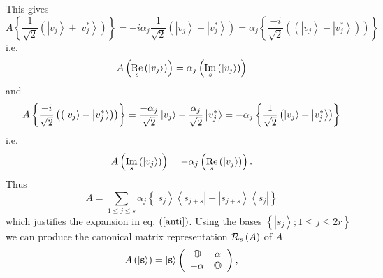 This gives 
\begin{equation}
A\left\{ \frac{1}{\sqrt{2}}\left( \left\vert v_{j}\right\rangle +\left\vert
v_{j}^{\ast }\right\rangle \right) \right\} =-i\alpha _{j}\frac{1}{\sqrt{2}}%
\left( \left\vert v_{j}\right\rangle -\left\vert v_{j}^{\ast }\right\rangle
\right) =\alpha _{j}\left\{ \frac{-i}{\sqrt{2}}\left( \left( \left\vert
v_{j}\right\rangle -\left\vert v_{j}^{\ast }\right\rangle \right) \right)
\right\}  \nonumber
\end{equation}%
i.e. 
\begin{equation}
A\left( 
\mathop{\rm Re}%
_{s}\left( \left\vert v_{j}\right\rangle \right) \right) =\alpha _{j}\left( 
\mathop{\rm Im}%
_{s}\left( \left\vert v_{j}\right\rangle \right) \right)  \nonumber
\end{equation}%
and 
\begin{equation}
A\left\{ \frac{-i}{\sqrt{2}}\left( \left( \left\vert v_{j}\right\rangle
-\left\vert v_{j}^{\ast }\right\rangle \right) \right) \right\} =\frac{%
-\alpha _{j}}{\sqrt{2}}\left\vert v_{j}\right\rangle -\frac{\alpha _{j}}{%
\sqrt{2}}\left\vert v_{j}^{\ast }\right\rangle =-\alpha _{j}\left\{ \frac{1}{%
\sqrt{2}}\left( \left\vert v_{j}\right\rangle +\left\vert v_{j}^{\ast
}\right\rangle \right) \right\}  \nonumber
\end{equation}%
i.e. 
\begin{equation}
A\left( 
\mathop{\rm Im}%
_{s}\left( \left\vert v_{j}\right\rangle \right) \right) =-\alpha _{j}\left( 
\mathop{\rm Re}%
_{s}\left( \left\vert v_{j}\right\rangle \right) \right) .  \nonumber
\end{equation}%
Thus 
\begin{equation}
A=\sum_{1\leq j\leq s}\alpha _{j}\left\{ \left\vert s_{j}\right\rangle
\left\langle s_{j+s}\right\vert -\left\vert s_{j+s}\right\rangle
\left\langle s_{j}\right\vert \right\}
\end{equation}%
which justifies the expansion in eq. $\left( \ref{anti}\right) $. Using the
bases $\left\{ \left\vert s_{j}\right\rangle ;1\leq j\leq 2r\right\} $ we
can produce the canonical matrix representation ${\cal R}_{s}\left( A\right) 
$ of $A$ 
\begin{equation}
A\left( \left\vert {\bf s}\right\rangle \right) =\left\vert {\bf s}%
\right\rangle \left( 
\begin{array}{cc}
{\Bbb O} & {\bf \alpha } \\ 
-{\bf \alpha } & {\Bbb O}%
\end{array}%
\right) ,
\end{equation}%
